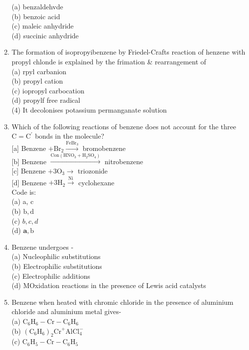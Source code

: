 \documentclass[10pt]{article}
\begin{document}
\begin{enumerate}
(a) benzaldehvde\\
(b) benzoic acid\\
(c) maleic anhydride\\
(d) succinic anhydride
  \item The formation of isopropyibenzene by Friedel-Crafts reaction of henzene with propyl chlonde is explained by the frimation \& rearrangement of\\
(a) rpyl carbanion\\
(b) propyl cation\\
(c) iopropyl carbocation\\
(d) propylf free radical\\
(4) It decolonises potassium permanganate solution
  \item Which of the following reactions of benzene does not account for the three $\mathrm{C}=\mathrm{C}^{\prime}$ bonds in the molecule?\\[0pt]
[a] Benzene $+\mathrm{Br}_{2} \xrightarrow{\mathrm{FeBr}_{3}}$ bromobenzene\\[0pt]
[b] Benzene $\xrightarrow{\mathrm{Con}\left(\mathrm{HNO}_{3}+\mathrm{H}_{2} \mathrm{SO}_{4}\right)}$ nitrobenzene\\[0pt]
[c] Benzene $+3 \mathrm{O}_{3} \rightarrow$ triozonide\\[0pt]
[d] Benzene $+3 \mathrm{H}_{2} \xrightarrow{\mathrm{Ni}}$ cyclohexane\\
Code is:\\
(a) a, c\\
(b) $\mathrm{b}, \mathrm{d}$\\
(c) $b, c, d$\\
(d) $\mathbf{a}, \mathrm{b}$
  \item Benzene undergoes -\\
(a) Nucleophilic substitutions\\
(b) Electrophilic substitutions\\
(c) Electrophilic additions\\
(d) MOxidation reactions in the presence of Lewis acid catalysts
  \item Benzene when heated with chromic chloride in the presence of aluminium chloride and aluminium metal gives-\\
(a) $\mathrm{C}_{6} \mathrm{H}_{6}-\mathrm{Cr}-\mathrm{C}_{6} \mathrm{H}_{6}$\\
(b) $\left(\mathrm{C}_{6} \mathrm{H}_{6}\right)_{2} \mathrm{Cr}^{+} \mathrm{AlCl}_{4}^{-}$\\
(c) $\mathrm{C}_{6} \mathrm{H}_{5}-\mathrm{Cr}-\mathrm{C}_{6} \mathrm{H}_{5}$\\

\end{enumerate}
\end{document}
